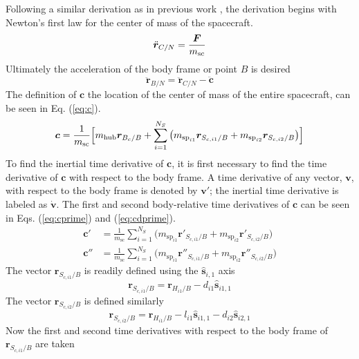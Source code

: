 \documentclass[paper]{aiaaNew}
\begin{document}
	Following a similar derivation as in previous work \cite{Allard2016rz}, the derivation begins with Newton's first law for the center of mass of the spacecraft.
	\begin{equation}
	\ddot{\bm r}_{C/N} = \frac{\bm{F}}{m_{\text{\text{sc}}}}
	\label{eq:Newtons1Law}
	\end{equation}
	Ultimately the acceleration of the body frame or point $B$ is desired
	\begin{equation}
	\ddot{\bm r}_{B/N} = \ddot{\bm r}_{C/N}-\ddot{\bm c}
	\label{eq:RcRbacc}
	\end{equation}
	The definition of $\bm{c}$ the location of the center of mass of the entire spacecraft, can be seen in Eq. (\ref{eq:c}).
	\begin{equation}
	\bm{c} = \frac{1}{m_{\text{sc}}}\Big[m_{\text{\text{hub}}}\bm{r}_{B_{c}/B} +\sum_{i=1}^{N_{S}}\big(m_{\text{sp}_{i1}}\bm{r}_{S_{c,i1}/B}+m_{\text{sp}_{i2}}\bm{r}_{S_{c,i2}/B}\big)\Big]
	\label{eq:c} 
	\end{equation}
	To find the inertial time derivative of $\bm{c}$, it is first necessary to find the time derivative of $\bm{c}$ with respect to the body frame. A time derivative of any vector, $\bm{v}$, with respect to the body frame is denoted by $\bm{v}'$; the inertial time derivative is labeled as $\dot{\bm{v}}$. The first and second body-relative time derivatives of $\bm{c}$ can be seen in Eqs. (\ref{eq:cprime}) and (\ref{eq:cdprime}).
	\begin{align}
	\bm{c}' &= \frac{1}{m_{\text{sc}}}\sum_{i=1}^{N_{S}}\big(m_{\text{sp}_{i1}}\bm{r}'_{S_{c,i1}/B}+m_{\text{sp}_{i2}}\bm{r}'_{S_{c,i2}/B}\big)
	\label{eq:cprime}
\\
	\bm{c}'' &= \frac{1}{m_{\text{sc}}}\sum_{i=1}^{N_{S}}\big(m_{\text{sp}_{i1}}\bm{r}''_{S_{c,i1}/B}+m_{\text{sp}_{i2}}\bm{r}''_{S_{c,i2}/B}\big)
	\label{eq:cdprime}
	\end{align}
	The vector $\bm{r}_{S_{c,i1}/B}$ is readily defined using the $\hat{\bm{s}}_{i,1}$ axis
	\begin{equation}
	\bm{r}_{S_{c,{i1}}/B} = 	\bm{r}_{H_{i1}/B} -d_{i1} \bm{\hat{s}}_{i1,1}
	\label{eq:rcgspi1}
	\end{equation}
	The vector $\bm{r}_{S_{c,i2}/B}$ is defined similarly
	\begin{equation}
	\bm{r}_{S_{c,{i2}}/B} = 	\bm{r}_{H_{i1}/B} -l_{i1} \bm{\hat{s}}_{i1,1} - d_{i2}\bm{\hat{s}}_{i2,1}
	\label{eq:rcgspi2}
	\end{equation}
	Now the first and second time derivatives with respect to the body frame of $\bm{r}_{S_{c,i1}/B}$ are taken
\end{document}
